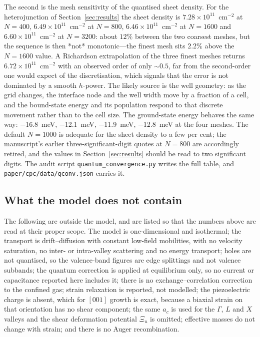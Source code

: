 \documentclass[preprint,12pt]{elsarticle}
\begin{document}
The second is the mesh sensitivity of the quantised sheet density. For the
heterojunction of Section~\ref{sec:results} the sheet density is
$7.28\times10^{11}$~cm$^{-2}$ at $N=400$, $6.49\times10^{11}$~cm$^{-2}$ at
$N=800$, $6.46\times10^{11}$~cm$^{-2}$ at $N=1600$ and
$6.60\times10^{11}$~cm$^{-2}$ at $N=3200$: about $12\%$ between the two
coarsest meshes, but the sequence is then *not* monotonic---the finest mesh
sits $2.2\%$ above the $N=1600$ value. A Richardson extrapolation of the
three finest meshes returns $6.72\times10^{11}$~cm$^{-2}$ with an observed
order of only $\sim0.5$, far from the second-order one would expect of the
discretisation, which signals that the error is not dominated by a smooth
$h$-power. The likely source is the well geometry: as the grid changes, the
interface node and the well width move by a fraction of a cell, and the
bound-state energy and its population respond to that discrete movement
rather than to the cell size. The ground-state energy behaves the same way:
\SI{-16.8}{meV}, \SI{-12.1}{meV}, \SI{-11.9}{meV}, \SI{-12.8}{meV} at the
four meshes. The default $N=1000$ is adequate for the sheet density to a few
per cent; the manuscript's earlier three-significant-digit quotes at $N=800$
are accordingly retired, and the values in Section~\ref{sec:results} should
be read to two significant digits. The audit script
\texttt{quantum\_convergence.py} writes the full table, and
\texttt{paper/cpc/data/qconv.json} carries it.

\subsection{What the model does not contain}

The following are outside the model, and are listed so that the numbers above
are read at their proper scope. The model is one-dimensional and isothermal; the transport is
drift--diffusion with constant low-field mobilities, with no velocity
saturation, no inter- or intra-valley scattering and no energy transport; holes
are not quantised, so the valence-band figures are edge splittings and not
valence subbands; the quantum correction is applied at equilibrium only, so no
current or capacitance reported here includes it; there is no exchange--correlation correction to the confined
gas; strain relaxation is reported, not modelled; the piezoelectric charge is
absent, which for $[001]$ growth is exact, because
a biaxial strain on that orientation has no shear component; the same $a_c$ is
used for the $\Gamma$, $L$ and $X$ valleys and the shear deformation potential
$\Xi_u$ is omitted; effective masses do not change with strain; and there is no
Auger recombination.
\end{document}
